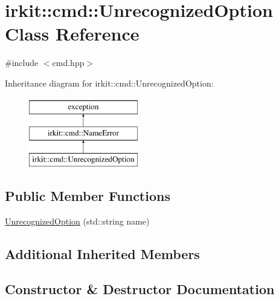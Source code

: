 \hypertarget{classirkit_1_1cmd_1_1UnrecognizedOption}{}\section{irkit\+:\+:cmd\+:\+:Unrecognized\+Option Class Reference}
\label{classirkit_1_1cmd_1_1UnrecognizedOption}


{\ttfamily \#include $<$cmd.\+hpp$>$}

Inheritance diagram for irkit\+:\+:cmd\+:\+:Unrecognized\+Option\+:\begin{figure}[H]
\begin{center}
\leavevmode
\includegraphics[height=3.000000cm]{classirkit_1_1cmd_1_1UnrecognizedOption}
\end{center}
\end{figure}
\subsection*{Public Member Functions}
\begin{DoxyCompactItemize}
\item 
\mbox{\hyperlink{classirkit_1_1cmd_1_1UnrecognizedOption_a5987ca2b3b283e6ef906388d321865c6}{Unrecognized\+Option}} (std\+::string name)
\end{DoxyCompactItemize}
\subsection*{Additional Inherited Members}


\subsection{Constructor \& Destructor Documentation}
\mbox{\label{classirkit_1_1cmd_1_1UnrecognizedOption_a5987ca2b3b283e6ef906388d321865c6}} 
